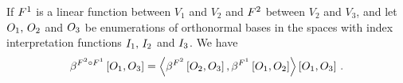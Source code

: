 \begin{theorem}
    \label{the:linearCompositionBasisEncoding}
    If $F^{1}$ is a linear function between $V_1$ and $V_2$  and $F^{2}$ between $V_2$ and $V_3$, and let $O_{1},\,O_{2}$ and $O_{3}$ be enumerations of orthonormal bases in the spaces with index interpretation functions $I_{1},\,I_{2}$ and $I_{3}$.
    We have
    \begin{align*}
        \beta^{F^{2}\circ F^{1}}\left[O_{1},O_{3}\right]
        = \left\langle 
            \beta^{F^{2}}\left[O_{2},O_{3}\right], \beta^{F^{1}}\left[O_{1},O_{2}\right]
        \right\rangle \left[ O_{1},O_{3} \right]  \, .
    \end{align*}
\end{theorem}
